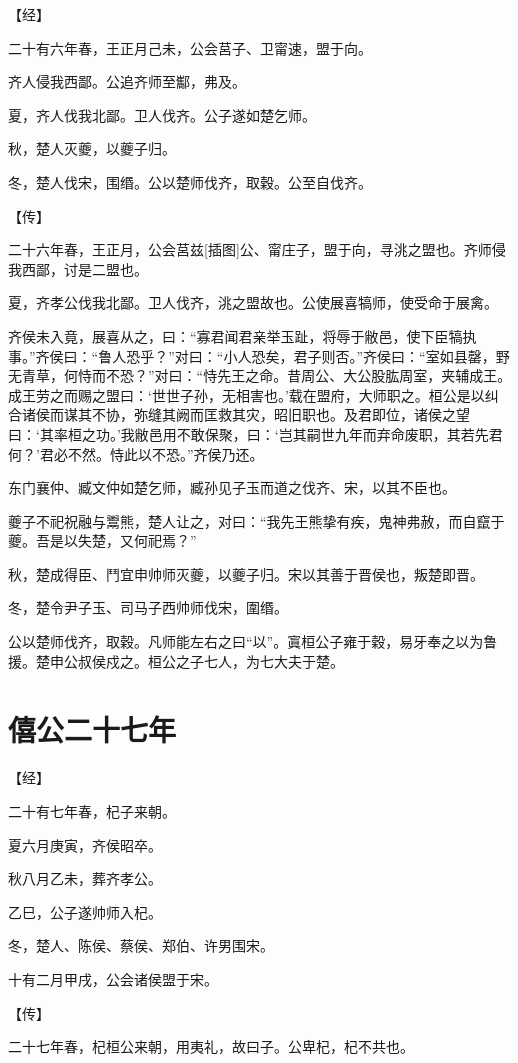 \documentclass[a4paper,12pt,UTF8,twoside]{ctexbook}
\begin{document}
【经】

二十有六年春，王正月己未，公会莒子、卫甯速，盟于向。

齐人侵我西鄙。公追齐师至酅，弗及。

夏，齐人伐我北鄙。卫人伐齐。公子遂如楚乞师。

秋，楚人灭夔，以夔子归。

冬，楚人伐宋，围缗。公以楚师伐齐，取穀。公至自伐齐。

【传】

二十六年春，王正月，公会莒兹[插图]公、甯庄子，盟于向，寻洮之盟也。齐师侵我西鄙，讨是二盟也。

夏，齐孝公伐我北鄙。卫人伐齐，洮之盟故也。公使展喜犒师，使受命于展禽。

齐侯未入竟，展喜从之，曰：“寡君闻君亲举玉趾，将辱于敝邑，使下臣犒执事。”齐侯曰：“鲁人恐乎？”对曰：“小人恐矣，君子则否。”齐侯曰：“室如县罄，野无青草，何恃而不恐？”对曰：“恃先王之命。昔周公、大公股肱周室，夹辅成王。成王劳之而赐之盟曰：‘世世子孙，无相害也。’载在盟府，大师职之。桓公是以纠合诸侯而谋其不协，弥缝其阙而匡救其灾，昭旧职也。及君即位，诸侯之望曰：‘其率桓之功。’我敝邑用不敢保聚，曰：‘岂其嗣世九年而弃命废职，其若先君何？’君必不然。恃此以不恐。”齐侯乃还。

东门襄仲、臧文仲如楚乞师，臧孙见子玉而道之伐齐、宋，以其不臣也。

夔子不祀祝融与鬻熊，楚人让之，对曰：“我先王熊挚有疾，鬼神弗赦，而自竄于夔。吾是以失楚，又何祀焉？”

秋，楚成得臣、鬥宜申帅师灭夔，以夔子归。宋以其善于晋侯也，叛楚即晋。

冬，楚令尹子玉、司马子西帅师伐宋，圍缗。

公以楚师伐齐，取穀。凡师能左右之曰“以”。寘桓公子雍于穀，易牙奉之以为鲁援。楚申公叔侯戍之。桓公之子七人，为七大夫于楚。


\section{僖公二十七年}


【经】

二十有七年春，杞子来朝。

夏六月庚寅，齐侯昭卒。

秋八月乙未，葬齐孝公。

乙巳，公子遂帅师入杞。

冬，楚人、陈侯、蔡侯、郑伯、许男围宋。

十有二月甲戌，公会诸侯盟于宋。

【传】

二十七年春，杞桓公来朝，用夷礼，故曰子。公卑杞，杞不共也。
\end{document}
